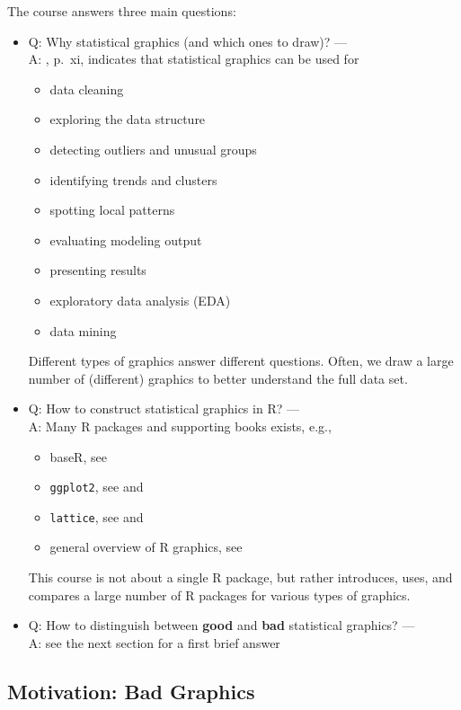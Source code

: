 \documentclass[12pt,letterpaper,final]{article}
\begin{document}
The course answers three main questions: 
\begin{itemize}
\item Q: Why statistical graphics (and which ones to draw)? --- \\
A: \cite{Un2015}, p.~xi, indicates that statistical graphics can be used for
\begin{itemize}
\item data cleaning
\item exploring the data structure
\item detecting outliers and unusual groups
\item identifying trends and clusters
\item spotting local patterns
\item evaluating modeling output
\item presenting results
\item exploratory data analysis (EDA)
\item data mining
\end{itemize}

Different types of graphics answer different questions. Often, we draw a large
number of (different) graphics to better understand the full data set.


\item Q: How to construct statistical graphics in R? --- \\
A: Many R packages and supporting books exists, e.g.,
\begin{itemize}
\item baseR, see \cite{RCore2017}
\item {\tt ggplot2}, see \cite{WiCh2016} and \cite{Wick2009}
\item {\tt lattice}, see \cite{Sar2017} and \cite{Sar2008}
\item general overview of R graphics, see \cite{Mu2006}
\end{itemize}
This course is not about a single R package, but rather introduces, uses, and compares
a large number of R packages for various types of graphics.

\item Q: How to distinguish between {\bf good} and {\bf bad} statistical graphics? --- \\
A: see the next section for a first brief answer 
\end{itemize}


\subsection{Motivation: Bad Graphics}
\end{document}
